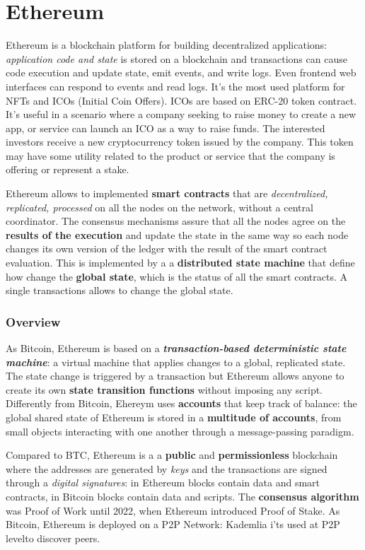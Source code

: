 \documentclass[10pt,a4paper]{report}
\begin{document}
\chapter{Ethereum}\label{chap:ethereum}
Ethereum is a blockchain platform for building decentralized applications: \textit{application code and state} is stored on a blockchain   and transactions can cause code execution and update state, emit events, and write logs. Even frontend web interfaces can respond to events and read logs.
It's the most used platform for NFTs and ICOs (Initial Coin Offers). ICOs are based on ERC-20 token contract. It's useful in a scenario where a company seeking to raise money to create a new app, or service can launch an ICO as a way to raise funds. The interested investors receive a new cryptocurrency token issued by the company. This token may have some utility related to the product or service that the company is offering or represent a stake.

Ethereum allows to implemented \textbf{smart contracts} that are \textit{decentralized, replicated, processed} on all the nodes on the network, without a central coordinator. The consensus mechanisms assure that all the nodes agree on the \textbf{results of the execution} and update the state in the same way so each node changes its own version of the ledger with the result of the smart contract evaluation. This is implemented by a a \textbf{distributed state machine} that define how change the \textbf{global state}, which is the status of all the smart contracts. A single transactions allows to change the global state.
\subsection{Overview}\label{sec:overview}
As Bitcoin, Ethereum is based on a \textit{\textbf{transaction-based deterministic state machine}}: a virtual machine that applies changes to a global, replicated state. The state change is triggered by a transaction but Ethereum allows anyone to create its own \textbf{state transition functions} without imposing any script.
Differently from Bitcoin, Ehereym uses \textbf{accounts} that keep track of balance: the global shared state of Ethereum is stored in a \textbf{multitude of accounts}, from small objects interacting with one another through a message-passing paradigm.

Compared to BTC, Ethereum is a a \textbf{public} and \textbf{permissionless} blockchain where the addresses are generated by \textit{keys} and the transactions are signed through a \textit{digital signatures}: in Ethereum blocks contain data and smart contracts, in Bitcoin blocks contain data and scripts.
The \textbf{consensus algorithm} was Proof of Work until 2022, when Ethereum introduced Proof of Stake. As Bitcoin, Ethereum is deployed on a P2P Network: Kademlia i'ts used at P2P levelto discover peers.
\end{document}
